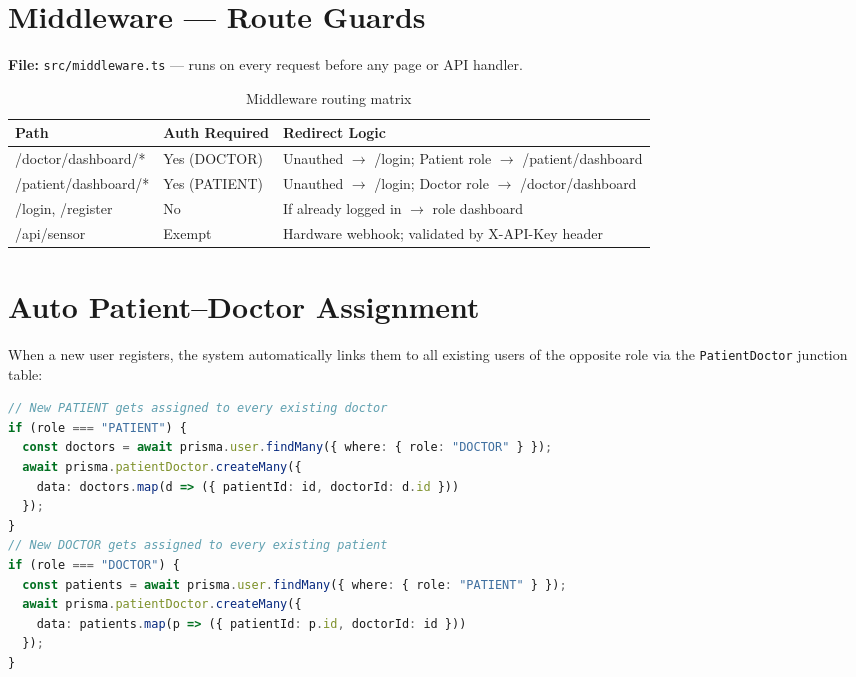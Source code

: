 \documentclass[12pt,a4paper]{report}
\begin{document}
\section{Middleware — Route Guards}

\textbf{File:} \texttt{src/middleware.ts} --- runs on every request before any page or API handler.

\begin{table}[H]\centering\renewcommand{\arraystretch}{1.4}
\begin{tabularx}{\linewidth}{>{\ttfamily\small}l l X}
\toprule
Path & Auth Required & Redirect Logic \\
\midrule
/doctor/dashboard/* & Yes (DOCTOR) & Unauthed $\to$ /login; Patient role $\to$ /patient/dashboard \\
/patient/dashboard/* & Yes (PATIENT) & Unauthed $\to$ /login; Doctor role $\to$ /doctor/dashboard \\
/login, /register & No & If already logged in $\to$ role dashboard \\
/api/sensor & Exempt & Hardware webhook; validated by X-API-Key header \\
\bottomrule
\end{tabularx}
\caption{Middleware routing matrix}
\end{table}

\section{Auto Patient--Doctor Assignment}

When a new user registers, the system automatically links them to all existing users of the opposite role via the \texttt{PatientDoctor} junction table:

\begin{lstlisting}[language=TypeScript,caption={POST /api/auth/register handler}]
// New PATIENT gets assigned to every existing doctor
if (role === "PATIENT") {
  const doctors = await prisma.user.findMany({ where: { role: "DOCTOR" } });
  await prisma.patientDoctor.createMany({
    data: doctors.map(d => ({ patientId: id, doctorId: d.id }))
  });
}
// New DOCTOR gets assigned to every existing patient
if (role === "DOCTOR") {
  const patients = await prisma.user.findMany({ where: { role: "PATIENT" } });
  await prisma.patientDoctor.createMany({
    data: patients.map(p => ({ patientId: p.id, doctorId: id }))
  });
}
\end{lstlisting}

\end{document}
